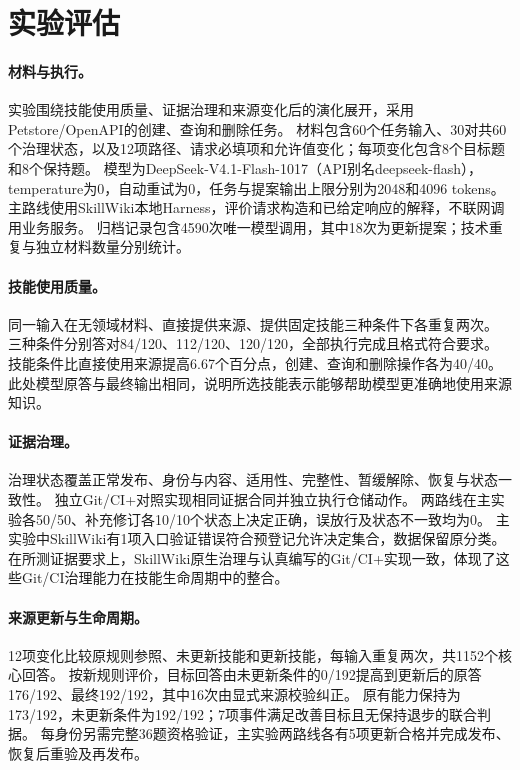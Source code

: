 \section{实验评估}
\label{sw-eval-section}

\paragraph{材料与执行。}
实验围绕技能使用质量、证据治理和来源变化后的演化展开，采用Petstore/OpenAPI的创建、查询和删除任务。
材料包含60个任务输入、30对共60个治理状态，以及12项路径、请求必填项和允许值变化；每项变化包含8个目标题和8个保持题。
模型为DeepSeek-V4.1-Flash-1017（API别名deepseek-flash），temperature为0，自动重试为0，任务与提案输出上限分别为2048和4096 tokens。
主路线使用SkillWiki本地Harness，评价请求构造和已给定响应的解释，不联网调用业务服务。
归档记录包含4590次唯一模型调用，其中18次为更新提案；技术重复与独立材料数量分别统计。

\paragraph{技能使用质量。}
同一输入在无领域材料、直接提供来源、提供固定技能三种条件下各重复两次。
三种条件分别答对84/120、112/120、120/120，全部执行完成且格式符合要求。
技能条件比直接使用来源提高6.67个百分点，创建、查询和删除操作各为40/40。
此处模型原答与最终输出相同，说明所选技能表示能够帮助模型更准确地使用来源知识。

\paragraph{证据治理。}
治理状态覆盖正常发布、身份与内容、适用性、完整性、暂缓解除、恢复与状态一致性。
独立Git/CI+对照实现相同证据合同并独立执行仓储动作。
两路线在主实验各50/50、补充修订各10/10个状态上决定正确，误放行及状态不一致均为0。
主实验中SkillWiki有1项入口验证错误符合预登记允许决定集合，数据保留原分类。
在所测证据要求上，SkillWiki原生治理与认真编写的Git/CI+实现一致，体现了这些Git/CI治理能力在技能生命周期中的整合。

\paragraph{来源更新与生命周期。}
12项变化比较原规则参照、未更新技能和更新技能，每输入重复两次，共1152个核心回答。
按新规则评价，目标回答由未更新条件的0/192提高到更新后的原答176/192、最终192/192，其中16次由显式来源校验纠正。
原有能力保持为173/192，未更新条件为192/192；7项事件满足改善目标且无保持退步的联合判据。
每身份另需完整36题资格验证，主实验两路线各有5项更新合格并完成发布、恢复后重验及再发布。

